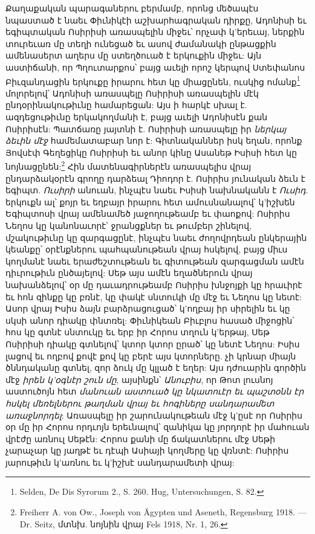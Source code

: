 \documentclass{article}
\begin{document}
{Քաղաքական պարագաներու բերմամբ, որոնց մեծապէս նպաստած է նաեւ Փիւնիկէի աշխարհագրական դիրքը, Ադոնիսի եւ եգիպտական Ոսիրիսի առասպելին միջեւ՝ որչափ կ'երեւայ, ներքին տուրեւառ մը տեղի ունեցած եւ ասով ժամանակի ընթացքին ամենասերտ աղերս մը ստեղծուած է երկուքին միջեւ: Այն աստիճանի, որ Պղուտարքոս՝ բայց աւելի որոշ կերպով Ստեփանոս Բիւզանդացին երկուքը իրարու հետ կը միացընեն, ուսկից ոմանք\footnote{Selden, De Dis Syrorum 2., S. 260. Hug, Untersuchungen, S. 82.} մոլորելով՝ Ադոնիսի առասպելը Ոսիրիսի առասպելին մէկ ընդօրինակութիւնը համարեցան: Այս ի հարկէ սխալ է. ազդեցութիւնը երկակողմանի է, բայց աւելի Ադոնիսէն քան Ոսիրիսէն: Պատճառը յայտնի է. Ոսիրիսի առասպելը իր \emph{ներկայ ձեւին մէջ} համեմատաբար նոր է: Գիտնականներ իսկ եղան, որոնք Յովսէփ Գեղեցիկը Ոսիրիսի եւ անոր կինը Ասանեթ Իսիսի հետ կը նոյնացընեն:\footnote{Freiherr A. von Ow., Joseph von Ägypten und Aseneth, Regensburg 1918. — Dr. Seitz, մտնխ. նոյնին վրայ Fels 1918, Nr. 1, 26.} Հին մատենագիրներէն առասպելիս վրայ ընդարձակօրէն գրողը դարձեալ Դիոդոր է. Ոսիրիս յունական ձեւն է եգիպտ. \emph{Ուսիրի} անուան, ինչպէս նաեւ Իսիսի նախնականն է \emph{Ուսիդ}. երկուքն ալ՝ քոյր եւ եղբայր իրարու հետ ամուսնանալով՝ կ'իշխեն Եգիպտոսի վրայ ամենամեծ յաջողութեամբ եւ փաոքով: Ոսիրիս Նեղոս կը կանոնաւորէ՝ ջրանցքներ եւ թումբեր շինելով, մշակութիւնը կը զարգացընէ, ինչպէս նաեւ ժողովրդեան ընկերային կեանքը՝ օրէնքներու պահպանութեան վրայ հսկելով, բայց միւս կողմանէ նաեւ երաժեշտութեան եւ գիտութեան զարգացման ամէն դիւրութիւն ընծայելով: Սեթ այս ամէն եղածներուն վրայ նախանձելով՝ օր մը դաւադրութեամբ Ոսիրիս խնջոյքի կը հրաւիրէ եւ հոն զինքը կը բռնէ, կը փակէ սնտուկի մը մէջ եւ Նեղոս կը նետէ: Ասոր վրայ Իսիս ձայն բարձրացուցած՝ կ'ողբայ իր սիրելին եւ կը սկսի անոր դիակը փնտռել: Փիւնիկեան Բիւբլոս հասած միջոցին՝ հոս կը գտնէ սնտուկը եւ երբ իր Հորոս տղուն կ'երթայ, Սեթ Ոսիրիսի դիակը գտնելով՝ կտոր կտոր ըրած՝ կը նետէ Նեղոս: Իսիս լացով եւ ողբով քովէ քով կը բերէ այս կտորները. չի կրնար միայն ծննդականը գտնել, զոր ձուկ մը կլլած է եղեր: Այս դժուարին գործին մէջ \emph{իրեն կ'օգնէր շուն մը}, այսինքն՝ \emph{Անուբիս}, որ Թոտ լուսնոյ աստուծոյն հետ \emph{մանուան աստուած կը նկատուէր եւ պաշտօնն էր հսկել մեռելներու թաղման վրայ եւ հոգիները սանդարամետ առաջնորդել}: Առասպելը իր շարունակութեան մէջ կ'ըսէ որ Ոսիրիս օր մը իր Հորոս որդւոյն երեւնալով՝ զանիկա կը յորդորէ իր մահուան վրէժը առնուլ Սեթէն: Հորոս քանի մը ճակատներու մէջ Սեթի չարաչար կը յաղթէ եւ դէպի Ասիայի կողմերը կը վռնտէ: Ոսիրիս յարութիւն կ'առնու եւ կ'իշխէ սանդարամետի վրայ:

}
\end{document}
